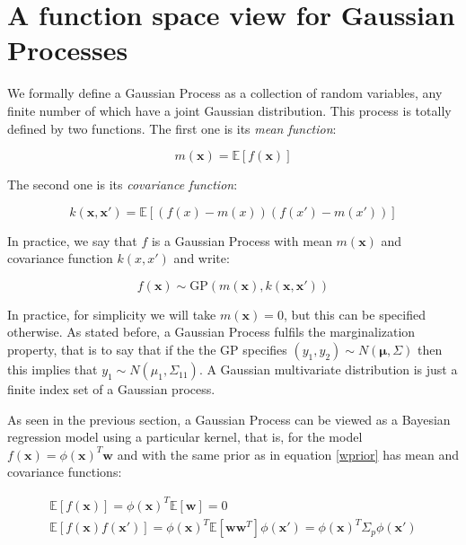\documentclass[10pt,a4paper,twoside]{book}
\begin{document}
\section{A function space view for Gaussian Processes}

We formally define a Gaussian Process as a collection of random variables, any finite number of which have a joint Gaussian distribution. This process is totally defined by two functions. The first one is its \textit{mean function}:

\begin{equation}
m(\boldsymbol{x}) = \mathbb{E}\left[f(\boldsymbol{x})\right]
\end{equation} 

The second one is its \textit{covariance function}:

\begin{equation}
k(\boldsymbol{x}, \boldsymbol{x'}) = \mathbb{E}\left[\left( f(x) - m(x) \right)\left( f(x') - m(x')\right)\right]
\end{equation}

In practice, we say that $f$ is a Gaussian Process with mean $m(\boldsymbol{x})$ and covariance function $k(x, x')$ and write:

\begin{equation}
f(\boldsymbol{x}) \sim \mathrm{GP}\left(m(\boldsymbol{x}), k(\boldsymbol{x}, \boldsymbol{x'}) \right)
\end{equation}

In practice, for simplicity we will take $m(\boldsymbol{x}) = 0$, but this can be specified otherwise. As stated before, a Gaussian Process fulfils the marginalization property, that is to say that if the the GP specifies $(y_1, y_2) \sim N(\boldsymbol{\mu}, \Sigma)$ then this implies that $y_1 \sim N(\mu_1, \Sigma_{11})$. A Gaussian multivariate distribution is just a finite index set of a Gaussian process. 

As seen in the previous section, a Gaussian Process can be viewed as a Bayesian regression model using a particular kernel, that is, for the model $f(\boldsymbol{x}) = \phi(\boldsymbol{x})^T \boldsymbol{w}$ and with the same prior as in equation \ref{wprior} has mean and covariance functions:

\begin{align}
\mathbb{E}\left[f(\boldsymbol{x})\right] = \phi(\boldsymbol{x})^T\mathbb{E}\left[\boldsymbol{w}\right] = 0\\
\mathbb{E}\left[f(\boldsymbol{x})f(\boldsymbol{x'})\right] = \phi(\boldsymbol{x})^T\mathbb{E}\left[\boldsymbol{w}\boldsymbol{w}^T\right]
\phi(\boldsymbol{x'}) = \phi(\boldsymbol{x})^T\Sigma_p\phi(\boldsymbol{x'})
\end{align}
\end{document}
